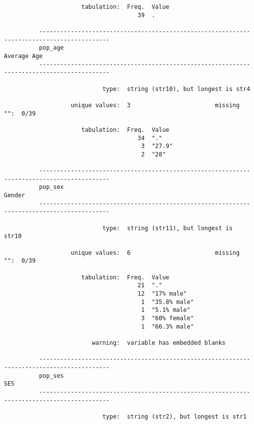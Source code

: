 \documentclass{article}
\begin{document}
\begin{verbatim}
                      tabulation:  Freq.  Value
                                      39  .
          
          ------------------------------------------------------------------------------------------
          pop_age                                                                        Average Age
          ------------------------------------------------------------------------------------------
          
                            type:  string (str10), but longest is str4
          
                   unique values:  3                        missing "":  0/39
          
                      tabulation:  Freq.  Value
                                      34  "."
                                       3  "27.9"
                                       2  "28"
          
          ------------------------------------------------------------------------------------------
          pop_sex                                                                             Gender
          ------------------------------------------------------------------------------------------
          
                            type:  string (str11), but longest is str10
          
                   unique values:  6                        missing "":  0/39
          
                      tabulation:  Freq.  Value
                                      21  "."
                                      12  "17% male"
                                       1  "35.8% male"
                                       1  "5.1% male"
                                       3  "60% female"
                                       1  "66.3% male"
          
                         warning:  variable has embedded blanks
          
          ------------------------------------------------------------------------------------------
          pop_ses                                                                                SES
          ------------------------------------------------------------------------------------------
          
                            type:  string (str2), but longest is str1
          

\end{verbatim}
\end{document}
